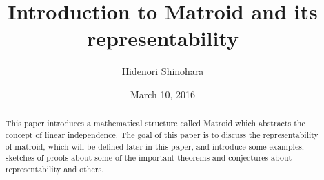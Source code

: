 \documentclass[psamsfonts]{amsart}
\title{Introduction to Matroid and its representability}
\author{Hidenori Shinohara}
\date{March 10, 2016}
\theoremstyle{definition}
\theoremstyle{remark}
\numberwithin{equation}{section}
\begin{document}
\begin{abstract}
This paper introduces a mathematical structure called Matroid which abstracts the concept of linear independence.
The goal of this paper is to discuss the representability of matroid, which will be defined later in this paper, and introduce some examples, sketches of proofs about some of the important theorems and conjectures about representability and others.

\end{abstract}

\maketitle

\tableofcontents








\end{document}
